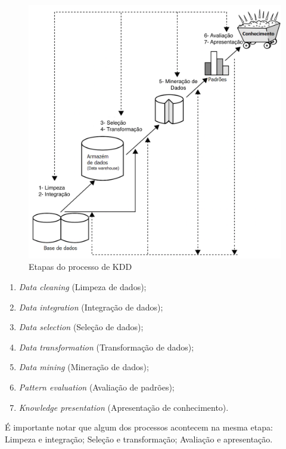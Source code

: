 \begin{figure}
	\centering
	\includegraphics[width=1\textwidth]{Cap3/imagens/kdd2}
	\caption{Etapas do processo de KDD}
	\vspace{-0.3cm}
	\label{kdd-fig}
\end{figure}

\begin{enumerate}
	\item \textit{Data cleaning} (Limpeza de dados);
	\item \textit{Data integration} (Integração de dados);
	\item \textit{Data selection} (Seleção de dados);
	\item \textit{Data transformation} (Transformação de dados);
	\item \textit{Data mining} (Mineração de dados);
	\item \textit{Pattern evaluation} (Avaliação de padrões);
	\item \textit{Knowledge presentation} (Apresentação de conhecimento).
\end{enumerate}

É importante notar que algum dos processos acontecem na mesma etapa: Limpeza e integração; Seleção e transformação; Avaliação e apresentação.

